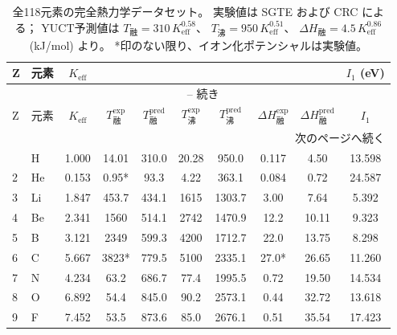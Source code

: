 \documentclass[11pt,a4paper]{article}
\begin{document}
	\setlength{\tabcolsep}{3pt}
	\begin{longtable}{@{}llcccccccc@{}}
		\caption{全118元素の完全熱力学データセット。  
			実験値は SGTE \cite{Dinsdale1991} および CRC \cite{CRC} による；  
			YUCT予測値は \(T_{\text{融}} = 310\,K_{\mathrm{eff}}^{0.58}\)、  
			\(T_{\text{沸}} = 950\,K_{\mathrm{eff}}^{0.51}\)、  
			\(\Delta H_{\text{融}} = 4.5\,K_{\mathrm{eff}}^{0.86}\) (kJ/mol) より。  
			*印のない限り、イオン化ポテンシャルは実験値。}
		\label{tab:full_118}\\
		\toprule
		Z & 元素 & \(K_{\mathrm{eff}}\) & 
		\makebox[1.5cm]{\(T_{\text{融}}^{\text{exp}}\) (K)} & 
		\makebox[1.5cm]{\(T_{\text{融}}^{\text{pred}}\) (K)} &
		\makebox[1.5cm]{\(T_{\text{沸}}^{\text{exp}}\) (K)} & 
		\makebox[1.5cm]{\(T_{\text{沸}}^{\text{pred}}\) (K)} &
		\makebox[1.5cm]{\(\Delta H_{\text{融}}^{\text{exp}}\) (kJ/mol)} & 
		\makebox[1.5cm]{\(\Delta H_{\text{融}}^{\text{pred}}\) (kJ/mol)} &
		\(I_1\) (eV) \\
		\midrule
		\endfirsthead
		\multicolumn{10}{c}{\tablename\ \thetable{} -- 続き} \\
		\toprule
		Z & 元素 & \(K_{\mathrm{eff}}\) & \(T_{\text{融}}^{\text{exp}}\) & \(T_{\text{融}}^{\text{pred}}\) &
		\(T_{\text{沸}}^{\text{exp}}\) & \(T_{\text{沸}}^{\text{pred}}\) & \(\Delta H_{\text{融}}^{\text{exp}}\) & \(\Delta H_{\text{融}}^{\text{pred}}\) & \(I_1\) \\
		\midrule
		\endhead
		\bottomrule
		\multicolumn{10}{r}{次のページへ続く} \\
		\endfoot
		\endlastfoot
		1  & H   & 1.000 & 14.01  & 310.0  & 20.28  & 950.0  & 0.117 & 4.50  & 13.598 \\
		2  & He  & 0.153 & 0.95*  & 93.3   & 4.22   & 363.1  & 0.084 & 0.72  & 24.587 \\
		3  & Li  & 1.847 & 453.7  & 434.1  & 1615   & 1303.7 & 3.00  & 7.64  & 5.392 \\
		4  & Be  & 2.341 & 1560   & 514.1  & 2742   & 1470.9 & 12.2  & 10.11 & 9.323 \\
		5  & B   & 3.121 & 2349   & 599.3  & 4200   & 1712.7 & 22.0  & 13.75 & 8.298 \\
		6  & C   & 5.667 & 3823*  & 779.5  & 5100   & 2335.1 & 27.0* & 26.65 & 11.260 \\
		7  & N   & 4.234 & 63.2   & 686.7  & 77.4   & 1995.5 & 0.72  & 19.50 & 14.534 \\
		8  & O   & 6.892 & 54.4   & 845.0  & 90.2   & 2573.1 & 0.44  & 32.72 & 13.618 \\
		9  & F   & 7.452 & 53.5   & 873.6  & 85.0   & 2676.1 & 0.51  & 35.54 & 17.423 \\

\end{longtable}
\end{document}
